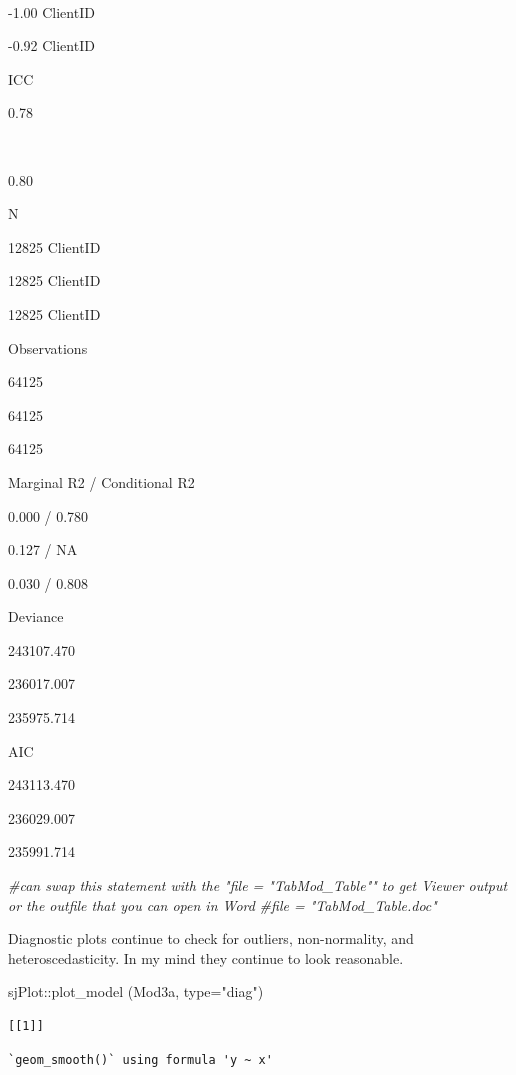 \documentclass[
  english,
]{book}
\newenvironment{Shaded}{\begin{snugshade}}{\end{snugshade}}
\newcommand{\AttributeTok}[1]{\textcolor[rgb]{0.77,0.63,0.00}{#1}}
\newcommand{\CommentTok}[1]{\textcolor[rgb]{0.56,0.35,0.01}{\textit{#1}}}
\newcommand{\FunctionTok}[1]{\textcolor[rgb]{0.00,0.00,0.00}{#1}}
\newcommand{\NormalTok}[1]{#1}
\newcommand{\SpecialCharTok}[1]{\textcolor[rgb]{0.00,0.00,0.00}{#1}}
\newcommand{\StringTok}[1]{\textcolor[rgb]{0.31,0.60,0.02}{#1}}
\begin{document}
~

-1.00 ClientID

-0.92 ClientID

ICC

0.78

~

0.80

N

12825 ClientID

12825 ClientID

12825 ClientID

Observations

64125

64125

64125

Marginal R2 / Conditional R2

0.000 / 0.780

0.127 / NA

0.030 / 0.808

Deviance

243107.470

236017.007

235975.714

AIC

243113.470

236029.007

235991.714

\begin{Shaded}
\begin{Highlighting}[]
\CommentTok{\#can swap this statement with the "file = "TabMod\_Table"" to get Viewer output or the outfile that you can open in Word}
\CommentTok{\#file = "TabMod\_Table.doc"}
\end{Highlighting}
\end{Shaded}

Diagnostic plots continue to check for outliers, non-normality, and heteroscedasticity. In my mind they continue to look reasonable.

\begin{Shaded}
\begin{Highlighting}[]
\NormalTok{sjPlot}\SpecialCharTok{::}\FunctionTok{plot\_model}\NormalTok{ (Mod3a, }\AttributeTok{type=}\StringTok{"diag"}\NormalTok{)}
\end{Highlighting}
\end{Shaded}

\begin{verbatim}
[[1]]
\end{verbatim}

\begin{verbatim}
`geom_smooth()` using formula 'y ~ x'
\end{verbatim}
\end{document}
